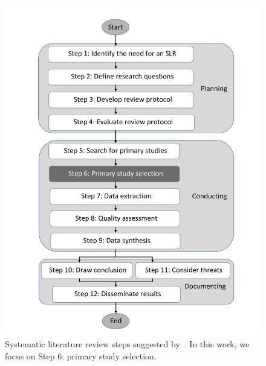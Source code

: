 \documentclass{svjour3}
\theoremstyle{break}
\begin{document}
\begin{figure}[t]
    \centering
    \begin{minipage}[t]{.48\linewidth}
    \includegraphics[width=\linewidth]{procedure.pdf}
    \caption{Systematic literature review steps suggested by~\cite{keele2007guidelines}. In this work, we focus on Step 6: primary study selection.}
    \label{fig: slr}
    \end{minipage}
    \begin{minipage}[t]{.48\linewidth}

\end{minipage}
\end{figure}
\end{document}
